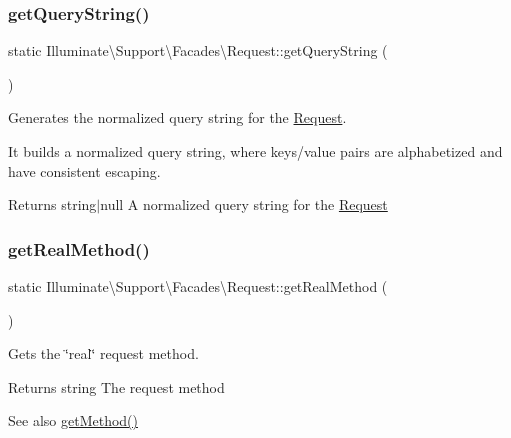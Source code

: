 \subsubsection{\texorpdfstring{get\+Query\+String()}{getQueryString()}}
{\footnotesize\ttfamily static Illuminate\textbackslash{}\+Support\textbackslash{}\+Facades\textbackslash{}\+Request\+::get\+Query\+String (\begin{DoxyParamCaption}{ }\end{DoxyParamCaption})\hspace{0.3cm}{\ttfamily [static]}}

Generates the normalized query string for the \mbox{\hyperlink{class_illuminate_1_1_support_1_1_facades_1_1_request}{Request}}.

It builds a normalized query string, where keys/value pairs are alphabetized and have consistent escaping.

\begin{DoxyReturn}{Returns}
string$\vert$null A normalized query string for the \mbox{\hyperlink{class_illuminate_1_1_support_1_1_facades_1_1_request}{Request}} 
\end{DoxyReturn}
\mbox{\label{class_illuminate_1_1_support_1_1_facades_1_1_request_acd2706ec8b8c53211875908b1246dd98}} 
\subsubsection{\texorpdfstring{get\+Real\+Method()}{getRealMethod()}}
{\footnotesize\ttfamily static Illuminate\textbackslash{}\+Support\textbackslash{}\+Facades\textbackslash{}\+Request\+::get\+Real\+Method (\begin{DoxyParamCaption}{ }\end{DoxyParamCaption})\hspace{0.3cm}{\ttfamily [static]}}

Gets the \char`\"{}real\char`\"{} request method.

\begin{DoxyReturn}{Returns}
string The request method 
\end{DoxyReturn}
\begin{DoxySeeAlso}{See also}
\mbox{\hyperlink{class_illuminate_1_1_support_1_1_facades_1_1_request_afbd81f562c546e8dc0b6f41b827bcbcb}{get\+Method()}} 
\end{DoxySeeAlso}
\mbox{\label{class_illuminate_1_1_support_1_1_facades_1_1_request_ac3134c844be4a9bf63a2f5e9153e0b0d}} 
